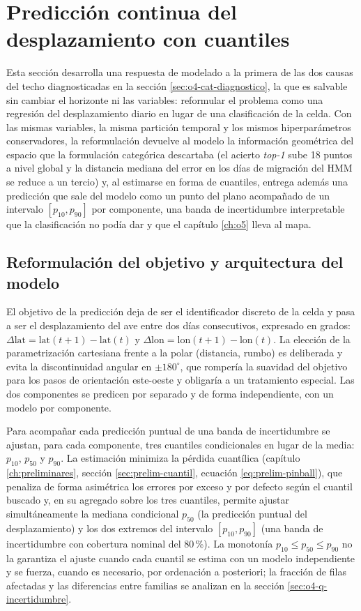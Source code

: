 \section{Predicción continua del desplazamiento con cuantiles}
\label{sec:o4-cuantiles}

Esta sección desarrolla una respuesta de modelado a la primera de las dos causas
del techo diagnosticadas en la sección \ref{sec:o4-cat-diagnostico}, la que es
salvable sin cambiar el horizonte ni las variables: reformular el problema como una
regresión del desplazamiento diario en lugar de una clasificación de la celda. Con
las mismas variables, la misma partición temporal y los mismos hiperparámetros
conservadores, la reformulación devuelve al modelo la información geométrica del
espacio que la formulación categórica descartaba (el acierto \textit{top-1} sube 18
puntos a nivel global y la distancia mediana del error en los días de migración del
HMM se reduce a un tercio) y, al estimarse en forma de cuantiles, entrega además
una predicción que sale del modelo como un punto del plano acompañado de un
intervalo $[p_{10}, p_{90}]$ por componente, una banda de incertidumbre
interpretable que la clasificación no podía dar y que el capítulo \ref{ch:o5} lleva
al mapa.

\subsection{Reformulación del objetivo y arquitectura del modelo}
\label{sec:o4-q-planteamiento}

El objetivo de la predicción deja de ser el identificador discreto de la celda y
pasa a ser el desplazamiento del ave entre dos días consecutivos, expresado en
grados: $\Delta\mathrm{lat} = \mathrm{lat}(t\!+\!1) - \mathrm{lat}(t)$ y
$\Delta\mathrm{lon} = \mathrm{lon}(t\!+\!1) - \mathrm{lon}(t)$. La elección de la
parametrización cartesiana frente a la polar (distancia, rumbo) es deliberada y
evita la discontinuidad angular en $\pm 180^\circ$, que rompería la suavidad del
objetivo para los pasos de orientación este-oeste y obligaría a un tratamiento
especial. Las dos componentes se predicen por separado y de forma independiente, con
un modelo por componente.

Para acompañar cada predicción puntual de una banda de incertidumbre se ajustan, para
cada componente, tres cuantiles condicionales en lugar de la media: $p_{10}$, $p_{50}$
y $p_{90}$. La estimación minimiza la pérdida cuantílica
(capítulo \ref{ch:preliminares}, sección \ref{sec:prelim-cuantil},
ecuación \ref{eq:prelim-pinball}), que penaliza de forma asimétrica los errores por
exceso y por defecto según el cuantil buscado y, en su agregado sobre los tres
cuantiles, permite ajustar simultáneamente la mediana condicional $p_{50}$ (la
predicción puntual del desplazamiento) y los dos extremos del intervalo
$[p_{10}, p_{90}]$ (una banda de incertidumbre con cobertura nominal del 80\,\%). La
monotonía $p_{10} \leq p_{50} \leq p_{90}$ no la garantiza el ajuste cuando cada
cuantil se estima con un modelo independiente y se fuerza, cuando es necesario, por
ordenación a posteriori; la fracción de filas afectadas y las diferencias entre
familias se analizan en la sección \ref{sec:o4-q-incertidumbre}.

